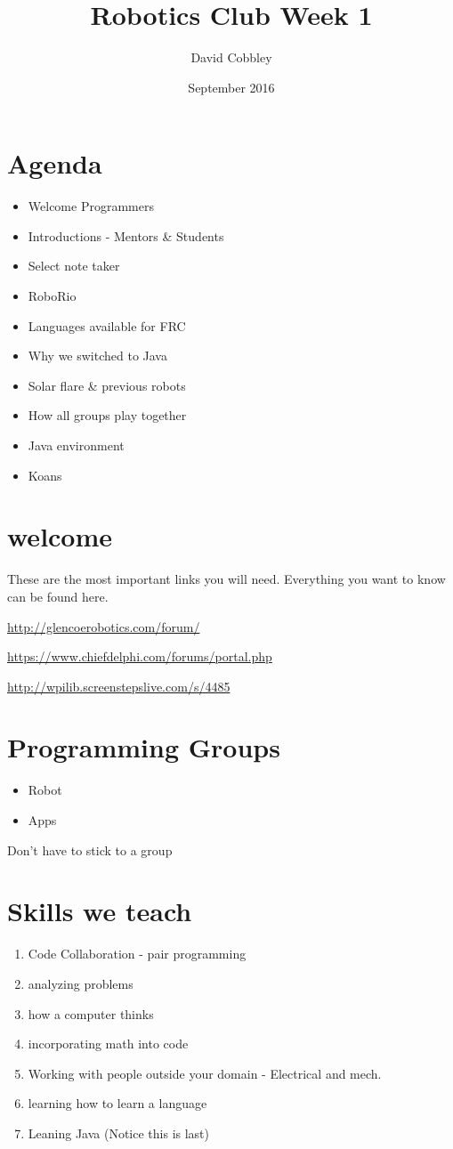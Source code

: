 \documentclass{article}
\title{Robotics Club Week 1}
\author{David Cobbley }
\date{September 2016}
\begin{document}
\maketitle

\section{Agenda}
\begin{itemize}
    \item Welcome Programmers
    \item Introductions - Mentors \& Students
    \item Select note taker
    \item RoboRio
    \item Languages available for FRC
    \item Why we switched to Java
    \item Solar flare \& previous robots
    \item How all groups play together
    \item Java environment
    \item Koans
\end{itemize}

\section{welcome}
These are the most important links you will need. Everything you want to know can be found here.

\url{http://glencoerobotics.com/forum/}

\url{https://www.chiefdelphi.com/forums/portal.php}

\url{http://wpilib.screenstepslive.com/s/4485}

\section{Programming Groups}
\begin{itemize}
    \item Robot
    \item Apps
\end{itemize}
Don't have to stick to a group

\pagebreak

\section{Skills we teach}
\begin{enumerate}
    \item Code Collaboration - pair programming
    \item analyzing problems
    \item how a computer thinks
    \item incorporating math into code
    \item Working with people outside your domain - Electrical and mech.
    \item learning how to learn a language
    \item Leaning Java (Notice this is last)
\end{enumerate}
\end{document}
